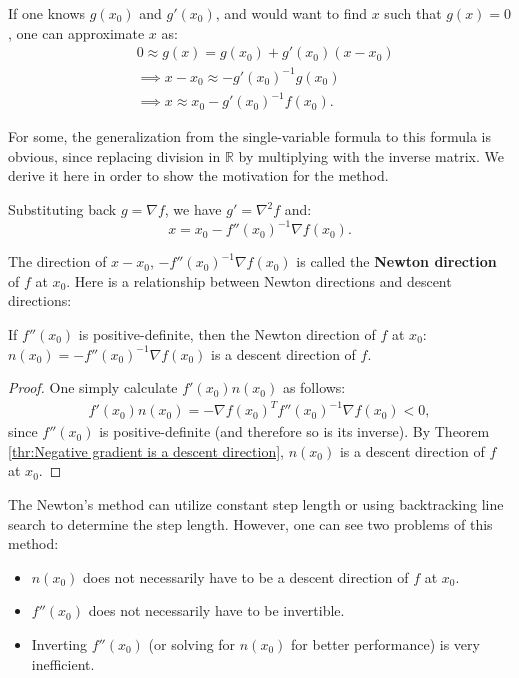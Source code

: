 If one knows \( g(x_{0}) \) and \( g'(x_{0}) \), and would want to find \( x \)
such that \( g(x) = 0 \), one can approximate \( x \) as:
\begin{align*}
  &0 \approx g(x) = g(x_{0}) + g'(x_{0})(x - x_{0}) \\
  &\implies x - x_{0} \approx - g'(x_{0})^{-1}g(x_{0})\\
  &\implies x \approx x_{0} - g'(x_{0})^{-1}f(x_{0})
.\end{align*}

For some, the generalization from the single-variable formula to this formula is
obvious, since replacing division in \( \mathbb{R} \) by multiplying with
the inverse matrix. We derive it here in order to show the motivation for the
method.

Substituting back \( g = \nabla f \), we have \( g' = \nabla ^2f \) and:
\[
  x = x_{0} - f''(x_{0})^{-1}\nabla f(x_{0})
.\] 

The direction of \( x - x_{0} \), \( -f''(x_{0})^{-1} \nabla f(x_{0}) \) is
called the \textbf{Newton direction} of \( f \) at \( x_{0} \). Here is a
relationship between Newton directions and descent directions:

\begin{theorem}
\label{thr:Newton directions are descent directions}
  If \( f''(x_{0}) \) is positive-definite, then the Newton direction of \( f \)
  at \( x_{0} \): \( n(x_{0}) = -f''(x_{0})^{-1}\nabla f(x_{0}) \) is a descent
  direction of \( f \).
\end{theorem}

\begin{proof}
  One simply calculate \( f'(x_{0})n(x_{0}) \) as follows:
  \begin{align*}
    f'(x_{0})n(x_{0}) = -\nabla f(x_{0})^{T}f''(x_{0})^{-1}\nabla f(x_{0}) < 0
  ,\end{align*} since \( f''(x_{0}) \) is positive-definite (and therefore so is
  its inverse). By Theorem \ref{thr:Negative gradient is a descent direction},
  \( n(x_{0}) \) is a descent direction of \( f \) at \( x_{0} \).
\end{proof}

The Newton's method can utilize constant step length or using backtracking line
search to determine the step length. However, one can see two problems of this method:
\begin{itemize}
\item \( n(x_{0}) \) does not necessarily have to be a descent direction of \( f
  \) at \( x_{0} \).
\item \( f''(x_{0}) \) does not necessarily have to be invertible.
\item Inverting \( f''(x_{0}) \) (or solving for \( n(x_{0}) \) for better
  performance) is very inefficient.
\end{itemize}

